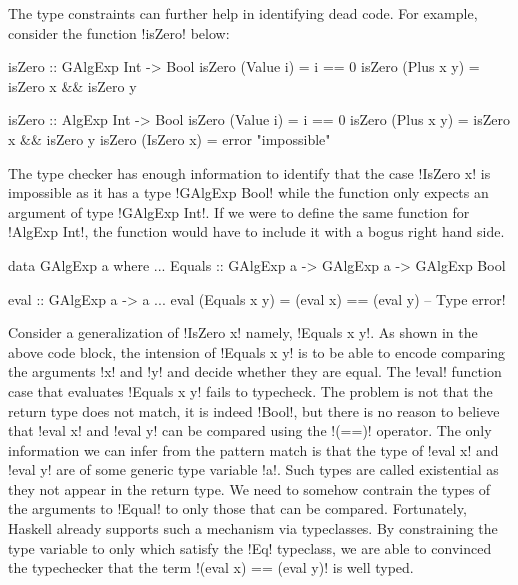 \documentclass[manuscript,screen,nonacm]{acmart}
\begin{document}
The type constraints can further help in identifying dead code. For example, consider the function !isZero! below:
\begin{minipage}[ht]{0.5\linewidth}
\begin{CenteredBox}
\begin{code}
isZero :: GAlgExp Int -> Bool
isZero (Value i)  = i == 0
isZero (Plus x y) = isZero x && isZero y
\end{code}
\end{CenteredBox}
\end{minipage}%
\begin{minipage}{0.5\linewidth}
\begin{code}
isZero :: AlgExp Int -> Bool
isZero (Value i)  = i == 0
isZero (Plus x y) = isZero x && isZero y
isZero (IsZero x) = error "impossible"
\end{code}
\end{minipage}

The type checker has enough information to identify that the case !IsZero x! is impossible as it has a type !GAlgExp Bool! while the function only expects an argument of type !GAlgExp Int!. If we were to define the same function for !AlgExp Int!, the function would have to include it with a bogus right hand side.

\begin{minipage}[ht]{0.5\linewidth}
\begin{code}
data GAlgExp a where
...
  Equals :: GAlgExp a -> GAlgExp a -> GAlgExp Bool
\end{code}
\end{minipage}%
\begin{minipage}[ht]{0.4\linewidth}
\begin{code}
eval :: GAlgExp a -> a
...
eval (Equals x y) = (eval x) == (eval y) -- Type error!
\end{code}
\end{minipage}

Consider a generalization of !IsZero x! namely, !Equals x y!. As shown in the above code block, the intension of !Equals x y! is to be able to encode comparing the arguments !x! and !y! and decide whether they are equal. The !eval! function case that evaluates !Equals x y! fails to typecheck. The problem is not that the return type does not match, it is indeed !Bool!, but there is no reason to believe that !eval x! and !eval y! can be compared using the !(==)! operator. The only information we can infer from the pattern match is that the type of !eval x! and !eval y! are of some generic type variable !a!. Such types are called existential as they not appear in the return type. We need to somehow contrain the types of the arguments to !Equal! to only those that can be compared. Fortunately, Haskell already supports such a mechanism via typeclasses. By constraining the type variable to only which satisfy the !Eq! typeclass, we are able to convinced the typechecker that the term  !(eval x) == (eval y)! is well typed.
\end{document}
